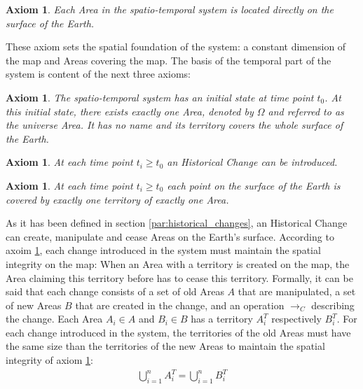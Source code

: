 \vspace{-2.5em}
\newtheorem{area_on_surface}[assicounter]{Axiom}
\begin{area_on_surface}
\label{axm:area_on_surface}
  Each Area in the spatio-temporal system is located directly on the surface of the Earth.
\end{area_on_surface}

These axiom sets the spatial foundation of the system: a constant dimension of the map and Areas covering the map. The basis of the temporal part of the system is content of the next three axioms:

\vspace{-1.0em}
\newtheorem{initial_configuration}[assicounter]{Axiom}
\begin{initial_configuration}
\label{axm:initial_configuration}
  The spatio-temporal system has an initial state at time point $t_0$. At this initial state, there exists exactly one Area, denoted by $\Omega$ and referred to as the \emph{universe} Area. It has no name and its territory covers the whole surface of the Earth.
\end{initial_configuration}

\vspace{-2.5em}
\newtheorem{historical_change}[assicounter]{Axiom}
\begin{historical_change}
\label{axm:historical_change}
  At each time point $t_i \geq t_0$ an Historical Change can be introduced.
\end{historical_change}

\vspace{-2.5em}
\newtheorem{unique_coverage}[assicounter]{Axiom}
\begin{unique_coverage}
\label{axm:unique_coverage}
  At each time point $t_i \geq t_0$ each point on the surface of the Earth is covered by exactly one territory of exactly one Area.
\end{unique_coverage}

As it has been defined in section \ref{par:historical_changes}, an Historical Change can create, manipulate and cease Areas on the Earth's surface. According to axoim \ref{axm:unique_coverage}, each change introduced in the system must maintain the spatial integrity on the map: When an Area with a territory is created on the map, the Area claiming this territory before has to cease this territory. Formally, it can be said that each change consists of a set of old Areas $A$ that are manipulated, a set of new Areas $B$ that are created in the change, and an operation $\rightarrow_C$ describing the change. Each Area $A_i \in A$ and $B_i \in B$ has a territory $A_i^T$  respectively $B_i^T$. For each change introduced in the system, the territories of the old Areas must have the same size than the territories of the new Areas to maintain the spatial integrity of axiom \ref{axm:unique_coverage}:
\begin{align}
  \bigcup\limits_{i=1}^n A_i^T ~\textbf{=}~ \bigcup\limits_{i=1}^n B_i^T
\end{align}

